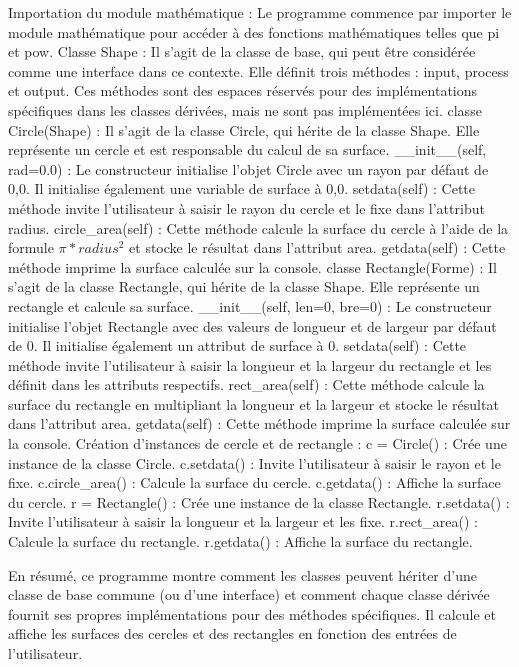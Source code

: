 \begin{solution}
    Importation du module mathématique : Le programme commence par importer le module mathématique pour accéder à des fonctions mathématiques telles que pi et pow.
    Classe Shape : Il s'agit de la classe de base, qui peut être considérée comme une interface dans ce contexte. Elle définit trois méthodes : input, process et output. Ces méthodes sont des espaces réservés pour des implémentations spécifiques dans les classes dérivées, mais ne sont pas implémentées ici.
    classe Circle(Shape) : Il s'agit de la classe Circle, qui hérite de la classe Shape. Elle représente un cercle et est responsable du calcul de sa surface.
        \_\_init\_\_(self, rad=0.0) : Le constructeur initialise l'objet Circle avec un rayon par défaut de 0,0. Il initialise également une variable de surface à 0,0.
        setdata(self) : Cette méthode invite l'utilisateur à saisir le rayon du cercle et le fixe dans l'attribut radius.
        circle\_area(self) : Cette méthode calcule la surface du cercle à l'aide de la formule $\pi * radius^2$ et stocke le résultat dans l'attribut area.
        getdata(self) : Cette méthode imprime la surface calculée sur la console.
    classe Rectangle(Forme) : Il s'agit de la classe Rectangle, qui hérite de la classe Shape. Elle représente un rectangle et calcule sa surface.
        \_\_init\_\_(self, len=0, bre=0) : Le constructeur initialise l'objet Rectangle avec des valeurs de longueur et de largeur par défaut de 0. Il initialise également un attribut de surface à 0.
        setdata(self) : Cette méthode invite l'utilisateur à saisir la longueur et la largeur du rectangle et les définit dans les attributs respectifs.
        rect\_area(self) : Cette méthode calcule la surface du rectangle en multipliant la longueur et la largeur et stocke le résultat dans l'attribut area.
        getdata(self) : Cette méthode imprime la surface calculée sur la console.
    Création d'instances de cercle et de rectangle :
        c = Circle() : Crée une instance de la classe Circle.
        c.setdata() : Invite l'utilisateur à saisir le rayon et le fixe.
        c.circle\_area() : Calcule la surface du cercle.
        c.getdata() : Affiche la surface du cercle.
        r = Rectangle() : Crée une instance de la classe Rectangle.
        r.setdata() : Invite l'utilisateur à saisir la longueur et la largeur et les fixe.
        r.rect\_area() : Calcule la surface du rectangle.
        r.getdata() : Affiche la surface du rectangle.

En résumé, ce programme montre comment les classes peuvent hériter d'une classe de base commune (ou d'une interface) et comment chaque classe dérivée fournit ses propres implémentations pour des méthodes spécifiques. Il calcule et affiche les surfaces des cercles et des rectangles en fonction des entrées de l'utilisateur.
        \end{solution}
        

